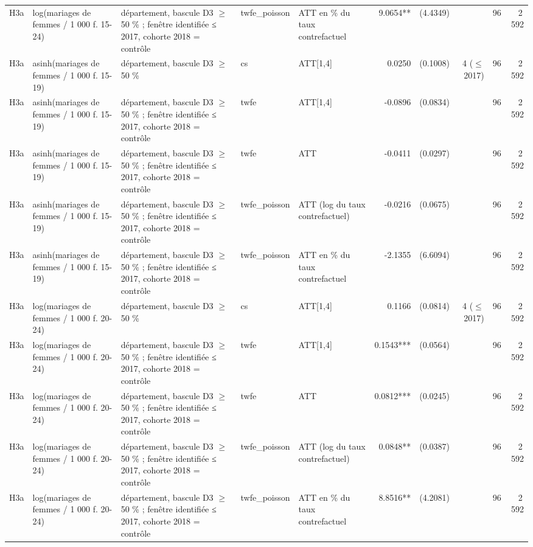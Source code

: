 \begin{table}
\begin{threeparttable}
\begin{tabular}{lp{3.8cm}p{5.5cm}lp{3.5cm}rrrrr}
H3a & log(mariages de femmes / 1 000 f. 15-24) & département, bascule D3 $\geq$ 50 \% ; fenêtre identifiée ≤ 2017, cohorte 2018 = contrôle & twfe\_poisson & ATT en \% du taux contrefactuel & 9.0654** & (4.4349) &  & 96 & 2\,592 \\
H3a & asinh(mariages de femmes / 1 000 f. 15-19) & département, bascule D3 $\geq$ 50 \% & cs & ATT[1,4] & 0.0250 & (0.1008) & 4 ($\leq$ 2017) & 96 & 2\,592 \\
H3a & asinh(mariages de femmes / 1 000 f. 15-19) & département, bascule D3 $\geq$ 50 \% ; fenêtre identifiée ≤ 2017, cohorte 2018 = contrôle & twfe & ATT[1,4] & -0.0896 & (0.0834) &  & 96 & 2\,592 \\
H3a & asinh(mariages de femmes / 1 000 f. 15-19) & département, bascule D3 $\geq$ 50 \% ; fenêtre identifiée ≤ 2017, cohorte 2018 = contrôle & twfe & ATT & -0.0411 & (0.0297) &  & 96 & 2\,592 \\
H3a & asinh(mariages de femmes / 1 000 f. 15-19) & département, bascule D3 $\geq$ 50 \% ; fenêtre identifiée ≤ 2017, cohorte 2018 = contrôle & twfe\_poisson & ATT (log du taux contrefactuel) & -0.0216 & (0.0675) &  & 96 & 2\,592 \\
H3a & asinh(mariages de femmes / 1 000 f. 15-19) & département, bascule D3 $\geq$ 50 \% ; fenêtre identifiée ≤ 2017, cohorte 2018 = contrôle & twfe\_poisson & ATT en \% du taux contrefactuel & -2.1355 & (6.6094) &  & 96 & 2\,592 \\
H3a & log(mariages de femmes / 1 000 f. 20-24) & département, bascule D3 $\geq$ 50 \% & cs & ATT[1,4] & 0.1166 & (0.0814) & 4 ($\leq$ 2017) & 96 & 2\,592 \\
H3a & log(mariages de femmes / 1 000 f. 20-24) & département, bascule D3 $\geq$ 50 \% ; fenêtre identifiée ≤ 2017, cohorte 2018 = contrôle & twfe & ATT[1,4] & 0.1543*** & (0.0564) &  & 96 & 2\,592 \\
H3a & log(mariages de femmes / 1 000 f. 20-24) & département, bascule D3 $\geq$ 50 \% ; fenêtre identifiée ≤ 2017, cohorte 2018 = contrôle & twfe & ATT & 0.0812*** & (0.0245) &  & 96 & 2\,592 \\
H3a & log(mariages de femmes / 1 000 f. 20-24) & département, bascule D3 $\geq$ 50 \% ; fenêtre identifiée ≤ 2017, cohorte 2018 = contrôle & twfe\_poisson & ATT (log du taux contrefactuel) & 0.0848** & (0.0387) &  & 96 & 2\,592 \\
H3a & log(mariages de femmes / 1 000 f. 20-24) & département, bascule D3 $\geq$ 50 \% ; fenêtre identifiée ≤ 2017, cohorte 2018 = contrôle & twfe\_poisson & ATT en \% du taux contrefactuel & 8.8516** & (4.2081) &  & 96 & 2\,592 \\

\end{tabular}
\end{threeparttable}
\end{table}
